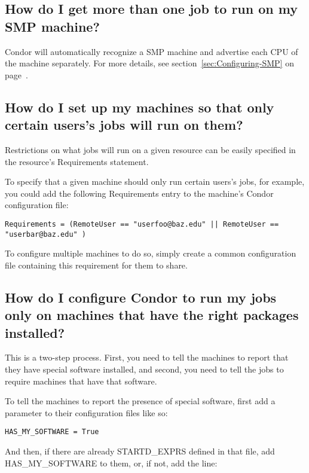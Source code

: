 \subsection{How do I get more than one job to run on my SMP machine?}

Condor will automatically recognize a SMP machine and advertise each
CPU of the machine separately.
For more details, see section~\ref{sec:Configuring-SMP} on
page~\pageref{sec:Configuring-SMP}.

\subsection{How do I set up my machines so that only certain users's
jobs will run on them?}

Restrictions on what jobs will run on a given resource can be easily
specified in the resource's Requirements statement.

To specify that a given machine should only run certain users's jobs,
for example, you could add the following Requirements entry to the
machine's Condor configuration file:

\begin{verbatim}Requirements = (RemoteUser == "userfoo@baz.edu" || RemoteUser == "userbar@baz.edu" )\end{verbatim}

To configure multiple machines to do so, simply create a common
configuration file containing this requirement for them to share.

\subsection{How do I configure Condor to run my jobs only on machines
that have the right packages installed?}

This is a two-step process.
First, you need to tell the machines to report that they have special
software installed, and second, you need to tell the jobs to require
machines that have that software.

To tell the machines to report the presence of special software, first
add a parameter to their configuration files like so:

\begin{verbatim}HAS_MY_SOFTWARE = True\end{verbatim}

And then, if there are already STARTD\_EXPRS defined in that file, add
HAS\_MY\_SOFTWARE to them, or, if not, add the line:

